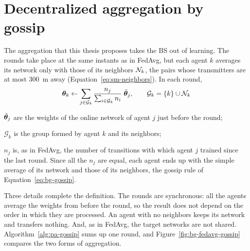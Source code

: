 \section{Decentralized aggregation by gossip}
\label{sec:pa-gossip}

The aggregation that this thesis proposes takes the \ac{BS} out of learning. The rounds take place at the
same instants as in \ac{FedAvg}, but each agent $k$ averages its network only with those of its neighbors
$\mathcal{N}_k$, the pairs whose transmitters are at most \SI{300}{\meter} away
(Equation~\ref{eq:sm-neighbors}). In each round,
\begin{equation}
  \bm{\theta}_k \leftarrow \sum_{j \in \mathcal{G}_k} \frac{n_j}{\sum_{i \in \mathcal{G}_k} n_i}\;
    \bar{\bm{\theta}}_j , \qquad \mathcal{G}_k = \{k\} \cup \mathcal{N}_k
  \label{eq:pa-gossip}
\end{equation}
\begin{wherelist}
  \item $\bar{\bm{\theta}}_j$ are the weights of the online network of agent $j$ just before the round;
  \item $\mathcal{G}_k$ is the group formed by agent $k$ and its neighbors;
  \item $n_j$ is, as in \ac{FedAvg}, the number of transitions with which agent $j$ trained since the last
    round. Since all the $n_j$ are equal, each agent ends up with the simple average of its network and those
    of its neighbors, the gossip rule of Equation~\ref{eq:bg-gossip}.
\end{wherelist}
Three details complete the definition. The rounds are synchronous: all the agents average the weights from
before the round, so the result does not depend on the order in which they are processed. An agent with no
neighbors keeps its network and transfers nothing. And, as in \ac{FedAvg}, the target networks are not
shared. Algorithm~\ref{alg:pa-gossip} sums up one round, and Figure~\ref{fig:bg-fedavg-gossip} compares the
two forms of aggregation.

